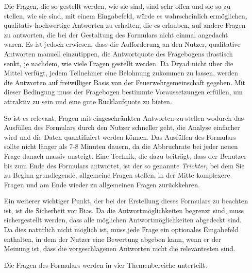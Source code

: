 Die Fragen, die so gestellt werden, wie sie sind, sind sehr offen und sie so zu stellen, wie sie sind, mit einem Eingabefeld, würde es wahrscheinlich ermöglichen, qualitativ hochwertige Antworten zu erhalten, die es erlauben, auf andere Fragen zu antworten, die bei der Gestaltung des Formulars nicht einmal angedacht waren.
Es ist jedoch erwiesen, dass die Aufforderung an den Nutzer, qualitative Antworten manuell einzutippen, die Antwortquote des Fragebogens drastisch senkt, je nachdem, wie viele Fragen gestellt werden\cite{userSurveys}.
Da Dryad nicht über die Mittel verfügt, jedem Teilnehmer eine Belohnung zukommen zu lassen, werden die Antworten auf freiwilliger Basis von der Feuerwehrgemeinschaft gegeben.
Mit dieser Bedingung muss der Fragebogen bestimmte Voraussetzungen erfüllen, um attraktiv zu sein und eine gute Rücklaufquote zu bieten.

So ist es relevant, Fragen mit eingeschränkten Antworten zu stellen wodurch das Ausfüllen des Formulars durch den Nutzer schneller geht, die Analyse einfacher wird und die Daten quantifiziert werden können.
Das Ausfüllen des Formulars sollte nicht länger als 7-8 Minuten dauern, da die Abbruchrate bei jeder neuen Frage danach massiv ansteigt\cite{surveyMonkey}.
Eine Technik, die dazu beiträgt, dass der Benutzer bis zum Ende des Formulars antwortet, ist der so genannte \textit{Trichter}, bei dem Sie zu Beginn grundlegende, allgemeine Fragen stellen, in der Mitte komplexere Fragen und am Ende wieder zu allgemeinen Fragen zurückkehren.

Ein weiterer wichtiger Punkt, der bei der Erstellung dieses Formulars zu beachten ist, ist die Sicherheit vor Bias.
Da die Antwortmöglichkeiten begrenzt sind, muss sichergestellt werden, dass alle möglichen Antwortmöglichkeiten abgedeckt sind.
Da dies natürlich nicht möglich ist, muss jede Frage ein optionales Eingabefeld enthalten, in dem der Nutzer eine Bewertung abgeben kann, wenn er der Meinung ist, dass die vorgeschlagenen Antworten nicht die relevantesten sind.

Die Fragen des Formulars werden in vier Themenbereiche unterteilt.

